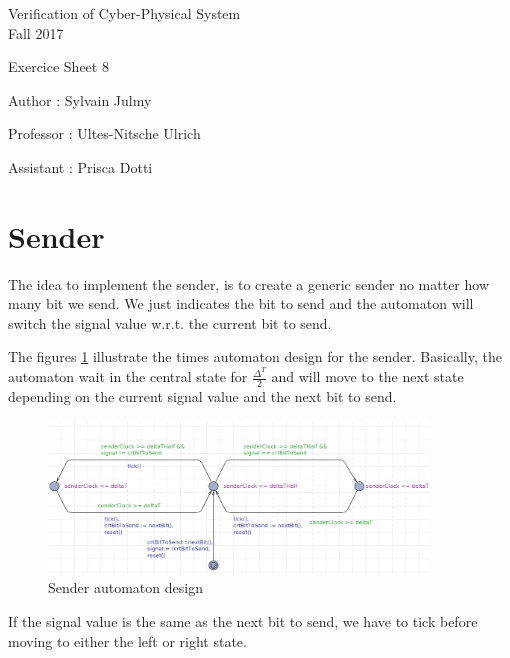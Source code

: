 \documentclass[a4paper,11pt]{report}
\author{Sylvain Julmy}
\date{\today}
\begin{document}
\begin{center}
  \Large{
    Verification of Cyber-Physical System\\
    Fall 2017
  }
  
  \noindent\makebox[\linewidth]{\rule{\linewidth}{0.4pt}}
  Exercice Sheet 8

  \vspace*{1.4cm}

  Author : Sylvain Julmy
  \noindent\makebox[\linewidth]{\rule{\linewidth}{0.4pt}}

  \begin{flushleft}
    Professor : Ultes-Nitsche Ulrich
    
    Assistant : Prisca Dotti
  \end{flushleft}

  \noindent\makebox[\linewidth]{\rule{\textwidth}{1pt}}
\end{center}

\section*{Sender}

The idea to implement the sender, is to create a generic sender no matter how
many bit we send. We just indicates the bit to send and the automaton will
switch the signal value w.r.t. the current bit to send.

The figures \ref{fig:sender} illustrate the times automaton design for the
sender. Basically, the automaton wait in the central state for
$\frac{\Delta^T}{2}$ and will move to the next state depending on the current
signal value and the next bit to send.

\begin{figure}[h]
  \centering
  \includegraphics[width=0.9\textwidth]{figures/sender}
  \caption{\label{fig:sender} Sender automaton design}
\end{figure}

If the signal value is the same as the next bit to send, we have to tick
before moving to either the left or right state.
\end{document}
